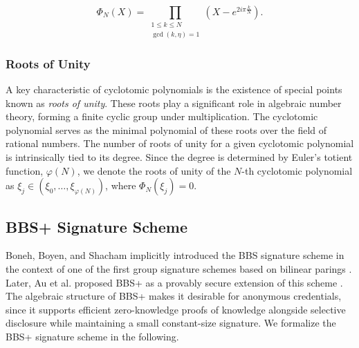 \begin{equation}
\label{eq:prelim_cyclotomic_poly}
\Phi_N(X)=\prod_{\substack{1 \leq k \leq N \\ \operatorname{gcd}(k, \eta)=1}}\left(X-e^{2 i \pi \frac{k}{N}}\right).
\end{equation}

\subsubsection{Roots of Unity}
A key characteristic of cyclotomic polynomials is the existence of special points known as \textit{roots of unity}. These roots play a significant role in algebraic number theory, forming a finite cyclic group under multiplication. The cyclotomic polynomial serves as the minimal polynomial of these roots over the field of rational numbers. The number of roots of unity for a given cyclotomic polynomial is intrinsically tied to its degree. Since the degree is determined by Euler's totient function, $\varphi(N)$, we denote the roots of unity of the $N$-th cyclotomic polynomial as $\xi_j \in (\xi_0, \ldots, \xi_{\varphi(N)})$, where $\Phi_N(\xi_j) = 0$. 


\subsection{BBS+ Signature Scheme}
\label{subsec:prelim_bbs}
Boneh, Boyen, and Shacham implicitly introduced the BBS signature scheme in the context of one of the first group signature schemes based on bilinear parings \cite{boneh2004short}. Later, Au et al. proposed BBS+ as a provably secure extension of this scheme \cite{au2006constant}. The algebraic structure of BBS+ makes it desirable for anonymous credentials, since it supports efficient zero-knowledge proofs of knowledge alongside selective disclosure while maintaining a small constant-size signature. We formalize the BBS+ signature scheme in the following.

